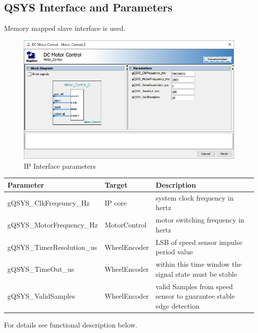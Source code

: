 \documentclass {scrartcl}
\begin{document}
\subsection{QSYS Interface and Parameters}
Memory mapped slave interface is used.

\begin{figure}[h]
	\centering
		\includegraphics[width=1.00\textwidth]{./Parameter.png}
	\caption{IP Interface parameters}
	\label{fig:QSYS_IF_Parameters}
\end{figure}
\begin{center}
  \begin{tabular}{ | l | l | p{5cm} |}
	  \hline
		\textbf{Parameter} & \textbf{Target} & \textbf{Description} \\
    \hline
		gQSYS\_ClkFreqeuncy\_Hz & IP core & system clock frequency in hertz \\
		\hline
		gQSYS\_MotorFrequency\_Hz & MotorControl & motor switching frequency in hertz \\
		\hline
		gQSYS\_TimerResolution\_us & WheelEncoder & LSB of speed sensor impulse period value \\
		\hline
		gQSYS\_TimeOut\_us & WheelEncoder & within this time window the signal state must be stable \\
		\hline		
		gQSYS\_ValidSamples & WheelEncoder & valid Samples from speed sensor to guarantee stable edge detection\\
		\hline
  \end{tabular}
\end{center}
For details see functional description below.
\end{document}
